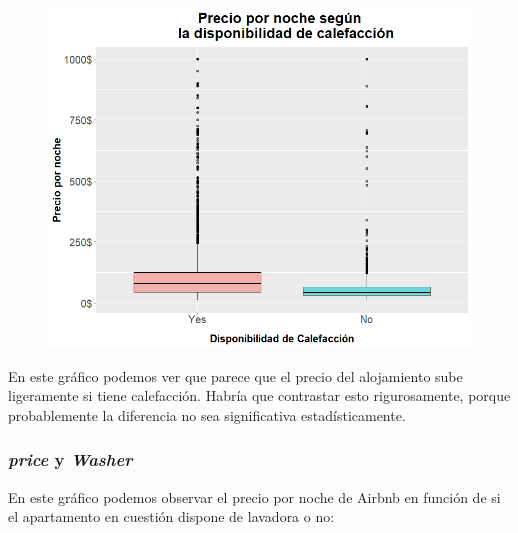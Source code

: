\documentclass{article}
\begin{document}
\vspace{0.35cm}
\begin{figure}[h]
\hspace*{-0.15cm}
\centering
\includegraphics[scale = 0.6]{boxplot_precio_Heating}
\end{figure}
\vspace{0.15cm}

En este gráfico podemos ver que parece que el precio del alojamiento sube ligeramente si tiene calefacción. Habría que contrastar esto rigurosamente, porque probablemente la diferencia no sea significativa estadísticamente.

\clearpage
\subsubsection{\emph{price} y \emph{Washer}}

En este gráfico podemos observar el precio por noche de Airbnb en función de si el apartamento en cuestión dispone de lavadora o no:
\end{document}
